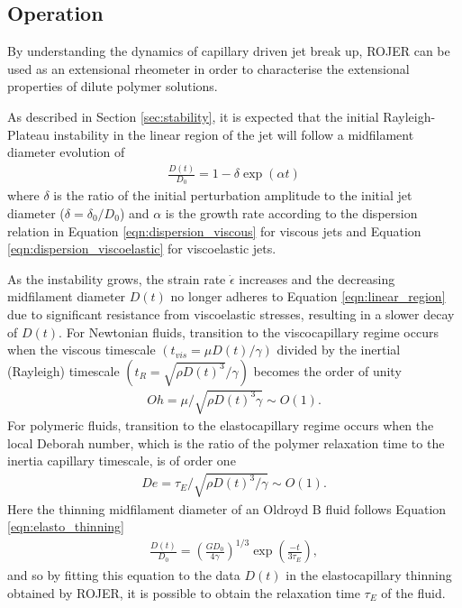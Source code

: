 \documentclass[11pt]{article}
\begin{document}
\subsection{Operation}
By understanding the dynamics of capillary driven jet break up, ROJER can be used as an extensional rheometer in order to characterise the extensional properties of dilute polymer solutions.

As described in Section \ref{sec:stability}, it is expected that the initial Rayleigh-Plateau instability in the linear region of the jet will follow a midfilament diameter evolution of
\begin{align}
\frac{D(t)}{D_0} = 1 - \delta \exp (\alpha t)
\label{eqn:linear_region}
\end{align}
where $\delta$ is the ratio of the initial perturbation amplitude to the initial jet diameter ($\delta = \delta_0 / D_0$) and $\alpha$ is the growth rate according to the dispersion relation in Equation \ref{eqn:dispersion_viscous} for viscous jets and Equation \ref{eqn:dispersion_viscoelastic} for viscoelastic jets.

As the instability grows, the strain rate $\dot{\epsilon}$ increases and the decreasing midfilament diameter $D(t)$ no longer adheres to Equation \ref{eqn:linear_region} due to significant resistance from viscoelastic stresses, resulting in a slower decay of $D(t)$. For Newtonian fluids, transition to the viscocapillary regime occurs when the viscous timescale $\left(t_{vis} = \mu D(t) /\gamma \right)$ divided by the inertial (Rayleigh) timescale $\left(t_R = \sqrt{\rho D(t)^3}/\gamma \right)$ becomes the order of unity \cite{clasen2012dispensing}
\begin{align*}
Oh = \mu/\sqrt{\rho D(t)^3 \gamma} \sim O(1).
\end{align*}
For polymeric fluids, transition to the elastocapillary regime occurs when the local Deborah number, which is the ratio of the polymer relaxation time to the inertia capillary timescale, is of order one 
\begin{align*}
De = \tau_E / \sqrt{\rho D(t)^3/\gamma} \sim O(1).
\end{align*}
Here the thinning midfilament diameter of an Oldroyd B fluid follows Equation \ref{eqn:elasto_thinning}
\begin{align}
\frac{D(t)}{D_0} = \left(\frac{G D_0}{4 \gamma}\right)^{1/3} \exp \left(\frac{-t}{3 \tau_E}\right),
\label{eqn:elasto_thinning4}
\end{align}
and so by fitting this equation to the data $D(t)$ in the elastocapillary thinning obtained by ROJER, it is possible to obtain the relaxation time $\tau_E$ of the fluid.
\end{document}
